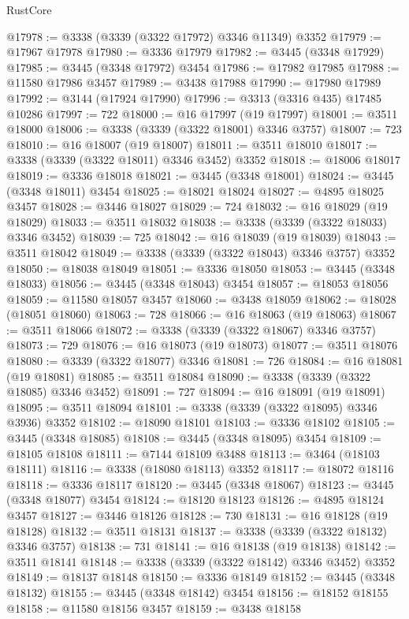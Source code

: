 \begin{lexlean}{RustCore}
\begin{coremodule}
@17978 := @3338 (@3339 (@3322 @17972) @3346 @11349) @3352
@17979 := @17967 @17978
@17980 := @3336 @17979
@17982 := @3445 (@3348 @17929)
@17985 := @3445 (@3348 @17972) @3454
@17986 := @17982 @17985
@17988 := @11580 @17986 @3457
@17989 := @3438 @17988
@17990 := @17980 @17989
@17992 := @3144 (@17924 @17990)
@17996 := @3313 (@3316 @435) @17485 @10286
@17997 := 722
@18000 := @16 @17997 (@19 @17997)
@18001 := @3511 @18000
@18006 := @3338 (@3339 (@3322 @18001) @3346 @3757)
@18007 := 723
@18010 := @16 @18007 (@19 @18007)
@18011 := @3511 @18010
@18017 := @3338 (@3339 (@3322 @18011) @3346 @3452) @3352
@18018 := @18006 @18017
@18019 := @3336 @18018
@18021 := @3445 (@3348 @18001)
@18024 := @3445 (@3348 @18011) @3454
@18025 := @18021 @18024
@18027 := @4895 @18025 @3457
@18028 := @3446 @18027
@18029 := 724
@18032 := @16 @18029 (@19 @18029)
@18033 := @3511 @18032
@18038 := @3338 (@3339 (@3322 @18033) @3346 @3452)
@18039 := 725
@18042 := @16 @18039 (@19 @18039)
@18043 := @3511 @18042
@18049 := @3338 (@3339 (@3322 @18043) @3346 @3757) @3352
@18050 := @18038 @18049
@18051 := @3336 @18050
@18053 := @3445 (@3348 @18033)
@18056 := @3445 (@3348 @18043) @3454
@18057 := @18053 @18056
@18059 := @11580 @18057 @3457
@18060 := @3438 @18059
@18062 := @18028 (@18051 @18060)
@18063 := 728
@18066 := @16 @18063 (@19 @18063)
@18067 := @3511 @18066
@18072 := @3338 (@3339 (@3322 @18067) @3346 @3757)
@18073 := 729
@18076 := @16 @18073 (@19 @18073)
@18077 := @3511 @18076
@18080 := @3339 (@3322 @18077) @3346
@18081 := 726
@18084 := @16 @18081 (@19 @18081)
@18085 := @3511 @18084
@18090 := @3338 (@3339 (@3322 @18085) @3346 @3452)
@18091 := 727
@18094 := @16 @18091 (@19 @18091)
@18095 := @3511 @18094
@18101 := @3338 (@3339 (@3322 @18095) @3346 @3936) @3352
@18102 := @18090 @18101
@18103 := @3336 @18102
@18105 := @3445 (@3348 @18085)
@18108 := @3445 (@3348 @18095) @3454
@18109 := @18105 @18108
@18111 := @7144 @18109 @3488
@18113 := @3464 (@18103 @18111)
@18116 := @3338 (@18080 @18113) @3352
@18117 := @18072 @18116
@18118 := @3336 @18117
@18120 := @3445 (@3348 @18067)
@18123 := @3445 (@3348 @18077) @3454
@18124 := @18120 @18123
@18126 := @4895 @18124 @3457
@18127 := @3446 @18126
@18128 := 730
@18131 := @16 @18128 (@19 @18128)
@18132 := @3511 @18131
@18137 := @3338 (@3339 (@3322 @18132) @3346 @3757)
@18138 := 731
@18141 := @16 @18138 (@19 @18138)
@18142 := @3511 @18141
@18148 := @3338 (@3339 (@3322 @18142) @3346 @3452) @3352
@18149 := @18137 @18148
@18150 := @3336 @18149
@18152 := @3445 (@3348 @18132)
@18155 := @3445 (@3348 @18142) @3454
@18156 := @18152 @18155
@18158 := @11580 @18156 @3457
@18159 := @3438 @18158

\end{coremodule}
\end{lexlean}
